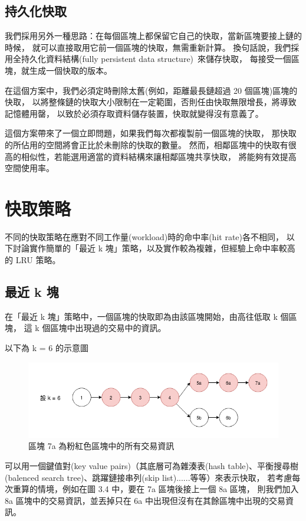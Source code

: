 \subsection{持久化快取}

我們採用另外一種思路：在每個區塊上都保留它自己的快取，當新區塊要接上鏈的時候，
就可以直接取用它前一個區塊的快取，無需重新計算。
換句話說，我們採用全持久化資料結構(fully persistent data structure)~\cite{driscoll1986making}來儲存快取，
每接受一個區塊，就生成一個快取的版本。

在這個方案中，我們必須定時刪除太舊(例如，距離最長鏈超過 20 個區塊)區塊的快取，
以將整條鏈的快取大小限制在一定範圍，否則任由快取無限增長，將導致記憶體用罄，
以致於必須存取資料儲存裝置，快取就變得沒有意義了。

這個方案帶來了一個立即問題，如果我們每次都複製前一個區塊的快取，
那快取的所佔用的空間將會正比於未刪除的快取的數量。
然而，相鄰區塊中的快取有很高的相似性，若能選用適當的資料結構來讓相鄰區塊共享快取，
將能夠有效提高空間使用率。

\section{快取策略}

不同的快取策略在應對不同工作量(workload)時的命中率(hit rate)各不相同，
以下討論實作簡單的「最近 k 塊」策略，以及實作較為複雜，但經驗上命中率較高的 LRU 策略。

\subsection{最近 k 塊}

在「最近 k 塊」策略中，一個區塊的快取即為由該區塊開始，由高往低取 k 個區塊，
這 k 個區塊中出現過的交易中的資訊。

以下為 k = 6 的示意圖

\begin{figure}[h]
\includegraphics[width=\textwidth]{最近k塊}
\caption{區塊 7a 為粉紅色區塊中的所有交易資訊}
\end{figure}

可以用一個鍵值對(key value pairs)（其底層可為雜湊表(hash table)、平衡搜尋樹(balenced search tree)、跳躍鏈接串列(skip list)......等等）來表示快取，
若考慮每次重算的情境，例如在圖 3.4 中，要在 7a 區塊後接上一個 8a 區塊，
則我們加入 8a 區塊中的交易資訊，並丟掉只在 6a 中出現但沒有在其餘區塊中出現的交易資訊。

